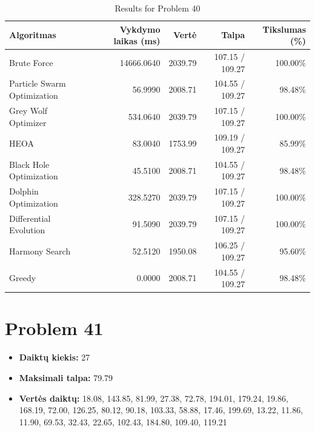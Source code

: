 \documentclass[a4paper,11pt]{article}
\begin{document}
\begin{table}[h!]
\centering
\begin{tabular}{lrrrr}
\toprule
\textbf{Algoritmas} & \textbf{Vykdymo laikas (ms)} & \textbf{Vertė} & \textbf{Talpa} & \textbf{Tikslumas (\%)} \\
\midrule
Brute Force & 14666.0640 & 2039.79 & 107.15 / 109.27 & 100.00\% \\
Particle Swarm Optimization & 56.9990 & 2008.71 & 104.55 / 109.27 & 98.48\% \\
Grey Wolf Optimizer & 534.0640 & 2039.79 & 107.15 / 109.27 & 100.00\% \\
HEOA & 83.0040 & 1753.99 & 109.19 / 109.27 & 85.99\% \\
Black Hole Optimization & 45.5100 & 2008.71 & 104.55 / 109.27 & 98.48\% \\
Dolphin Optimization & 328.5270 & 2039.79 & 107.15 / 109.27 & 100.00\% \\
Differential Evolution & 91.5090 & 2039.79 & 107.15 / 109.27 & 100.00\% \\
Harmony Search & 52.5120 & 1950.08 & 106.25 / 109.27 & 95.60\% \\
Greedy & 0.0000 & 2008.71 & 104.55 / 109.27 & 98.48\% \\
\bottomrule
\end{tabular}
\caption{Results for Problem 40}
\end{table}
\clearpage

\section*{Problem 41}
\begin{itemize}
    \item \textbf{Daiktų kiekis:} 27
    \item \textbf{Maksimali talpa:} 79.79
    \item \textbf{Vertės daiktų:} 18.08, 143.85, 81.99, 27.38, 72.78, 194.01, 179.24, 19.86, 168.19, 72.00, 126.25, 80.12, 90.18, 103.33, 58.88, 17.46, 199.69, 13.22, 11.86, 11.90, 69.53, 32.43, 22.65, 102.43, 184.80, 109.40, 119.21
\end{itemize}
\end{document}
